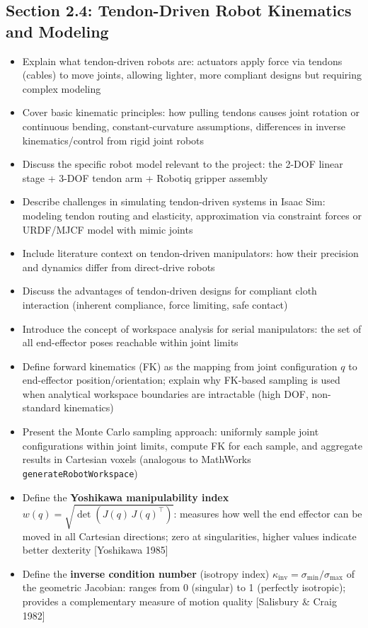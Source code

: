\subsection{Section 2.4: Tendon-Driven Robot Kinematics and Modeling}
\begin{itemize}
    \item Explain what tendon-driven robots are: actuators apply force via tendons (cables) to move joints, allowing lighter, more compliant designs but requiring complex modeling
    \item Cover basic kinematic principles: how pulling tendons causes joint rotation or continuous bending, constant-curvature assumptions, differences in inverse kinematics/control from rigid joint robots
    \item Discuss the specific robot model relevant to the project: the 2-DOF linear stage + 3-DOF tendon arm + Robotiq gripper assembly
    \item Describe challenges in simulating tendon-driven systems in Isaac Sim: modeling tendon routing and elasticity, approximation via constraint forces or URDF/MJCF model with mimic joints
    \item Include literature context on tendon-driven manipulators: how their precision and dynamics differ from direct-drive robots
    \item Discuss the advantages of tendon-driven designs for compliant cloth interaction (inherent compliance, force limiting, safe contact)
    \item Introduce the concept of workspace analysis for serial manipulators: the set of all end-effector poses reachable within joint limits
    \item Define forward kinematics (FK) as the mapping from joint configuration $q$ to end-effector position/orientation; explain why FK-based sampling is used when analytical workspace boundaries are intractable (high DOF, non-standard kinematics)
    \item Present the Monte Carlo sampling approach: uniformly sample joint configurations within joint limits, compute FK for each sample, and aggregate results in Cartesian voxels (analogous to MathWorks \texttt{generateRobotWorkspace})
    \item Define the \textbf{Yoshikawa manipulability index} $w(q) = \sqrt{\det(J(q)\,J(q)^\top)}$: measures how well the end effector can be moved in all Cartesian directions; zero at singularities, higher values indicate better dexterity [Yoshikawa 1985]
    \item Define the \textbf{inverse condition number} (isotropy index) $\kappa_{\mathrm{inv}} = \sigma_{\min}/\sigma_{\max}$ of the geometric Jacobian: ranges from 0 (singular) to 1 (perfectly isotropic); provides a complementary measure of motion quality [Salisbury \& Craig 1982]

\end{itemize}
